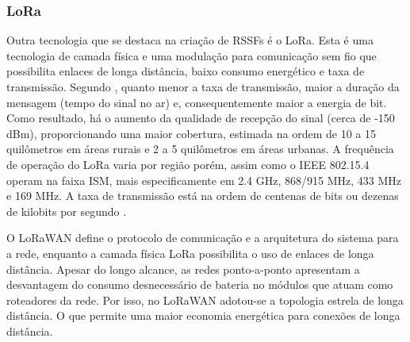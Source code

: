 
\subsubsection{LoRa}

Outra tecnologia que se destaca na criação de \ac{RSSF}s é o LoRa. Esta é uma tecnologia de camada física e uma modulação para comunicação sem fio que possibilita enlaces de longa distância, baixo consumo energético e taxa de transmissão. Segundo , quanto menor a taxa de transmissão, maior a duração da mensagem (tempo do sinal no ar) e, consequentemente maior a energia de bit. Como resultado, há o aumento da qualidade de recepção do sinal (cerca de -150 dBm), proporcionando uma maior cobertura, estimada na ordem de 10 a 15 quilômetros em áreas rurais e 2 a 5 quilômetros em áreas urbanas. A frequência de operação do LoRa varia por região porém, assim como o IEEE 802.15.4 operam na faixa \ac{ISM}, mais especificamente em 2.4 GHz, 868/915 MHz, 433 MHz e 169 MHz. A taxa de transmissão está na ordem de centenas de bits ou dezenas de kilobits por segundo \cite{CVZZ16}.

O LoRaWAN define o protocolo de comunicação e a arquitetura do sistema para a rede, enquanto a camada física LoRa possibilita o uso de enlaces de longa distância. Apesar do longo alcance, as redes ponto-a-ponto apresentam a desvantagem do consumo desnecessário de bateria no módulos que atuam como roteadores da rede. Por isso, no LoRaWAN adotou-se a topologia estrela de longa distância. O que permite uma maior economia energética para conexões de longa distância.

